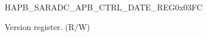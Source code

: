 \begin{register}{H}{APB\_SARADC\_APB\_CTRL\_DATE\_REG}{0x03FC}\label{regdesc:APBSARADCCTRLDATEREG}
%
\regnewline%
\begin{regdesc}\begin{reglist}
\label{fielddesc:APBSARADCDATE}\item [APB\_SARADC\_DATE] Version register. (R/W)
\end{reglist}\end{regdesc}
\end{register}
